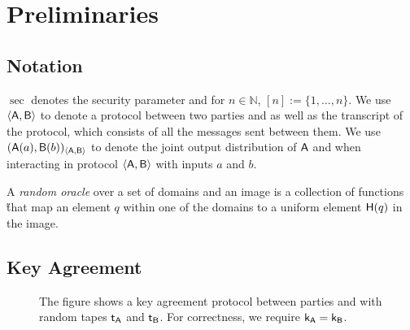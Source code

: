 \section{Preliminaries}

\subsection{Notation}
$\sec$ denotes the security parameter and for $n\in\mathbb N$, $[n]:=\{1,\dots,n\}$. We use $\langle \mathsf{A},\mathsf{B}\rangle$ to denote a protocol between two parties \A and \B as well as the transcript of the protocol, which consists of all the messages sent between them. We use $(\mathsf{A}(a),\mathsf{B}(b))_{\langle \mathsf{A},\mathsf{B}\rangle}$ to denote the joint output distribution of $\mathsf{A}$ and \B when interacting in protocol $\langle \mathsf{A},\mathsf{B}\rangle$ with inputs $a$ and $b$.


\begin{definition}
A \emph{random oracle} over a set of domains and an image is a collection of functions \H that map an element $q$ within one of the domains  to a uniform element $\mathsf{H}(q)$ in the image.  
\end{definition}


\subsection{Key Agreement}

\begin{figure}[h!]
\centering
{}
\label{fig:UKA}
\caption{The figure shows a key agreement protocol between parties \A and \B with random tapes $\mathsf{t}_\mathsf{A}$ and $\mathsf{t}_\mathsf{B}$. For correctness, we require $\mathsf{k}_\mathsf{A}=\mathsf{k}_\mathsf{B}$.}
\end{figure}


